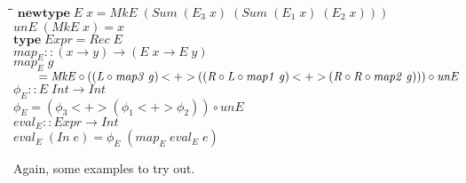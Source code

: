 \documentclass[10pt]{article}
\newlength{\lwidth}\setlength{\lwidth}{4.5cm}
\newlength{\cwidth}\setlength{\cwidth}{8mm} %
\newcommand{\Conid}[1]{\mathit{#1}}
\newcommand{\Varid}[1]{\mathit{#1}}
\begin{document}
\begin{tabbing}
\qquad\=\hspace{\lwidth}\=\hspace{\cwidth}\=\+\kill
${\mathbf{newtype}\;\Conid{E}\;\Varid{x}\mathrel{=}\Conid{MkE}\;(\Conid{Sum}\;(\Varid{E}_3\;\Varid{x})\;(\Conid{Sum}\;(\Varid{E}_1\;\Varid{x})\;(\Varid{E}_2\;\Varid{x})))}$\\
${}$\\
${\Varid{unE}\;(\Conid{MkE}\;\Varid{x})\mathrel{=}\Varid{x}}$\\
${}$\\
${\mathbf{type}\;\Conid{Expr}\mathrel{=}\Conid{Rec}\;\Conid{E}}$\\
${}$\\
${\Varid{map}_E\mathbin{::}(\Varid{x}\to \Varid{y})\to (\Conid{E}\;\Varid{x}\to \Conid{E}\;\Varid{y})}$\\
${\Varid{map}_E\;\Varid{g}}$\\
${\hskip2.00em\relax\mathrel{=}\Conid{MkE}\mathbin{\circ}((\Conid{L}\mathbin{\circ}\Varid{map3}\;\Varid{g})\mathbin{<+>}((\Conid{R}\mathbin{\circ}\Conid{L}\mathbin{\circ}\Varid{map1}\;\Varid{g})\mathbin{<+>}(\Conid{R}\mathbin{\circ}\Conid{R}\mathbin{\circ}\Varid{map2}\;\Varid{g})))\mathbin{\circ}\Varid{unE}}$\\
${}$\\
${\Varid{\phi}_E\mathbin{::}\Conid{E}\;\Conid{Int}\to \Conid{Int}}$\\
${\Varid{\phi}_E\mathrel{=}(\Varid{\phi_3}\mathbin{<+>}(\Varid{\phi_1}\mathbin{<+>}\Varid{\phi_2}))\mathbin{\circ}\Varid{unE}}$\\
${}$\\
${\Varid{eval}_E\mathbin{::}\Conid{Expr}\to \Conid{Int}}$\\
${\Varid{eval}_E\;(\Conid{In}\;\Varid{e})\mathrel{=}\Varid{\phi}_E\;(\Varid{map}_E\;\Varid{eval}_E\;\Varid{e})}$
\end{tabbing}
Again, some examples to try out.
\end{document}
